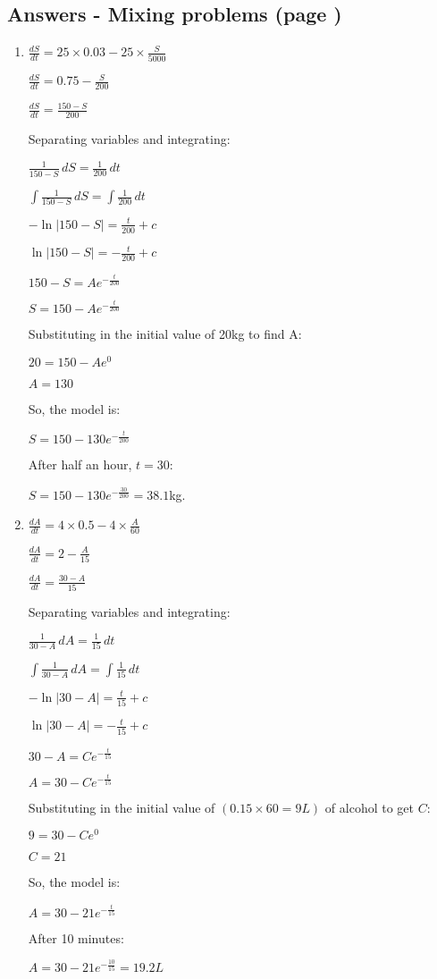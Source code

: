 \documentclass[../main.tex]{subfiles}
\begin{document}
\subsection*{Answers - Mixing problems (page \pageref{Mixing problems})}
\label{Mixing problems answers}
\begin{enumerate}[itemsep=0.7cm]
    \item 
    $\frac{dS}{dt}=25 \times 0.03 - 25 \times \frac{S}{5000}$

    $\frac{dS}{dt}=0.75 - \frac{S}{200}$

    $\frac{dS}{dt}=\frac{150-S}{200}$

    Separating variables and integrating:

    $\frac{1}{150-S}\,dS=\frac{1}{200}\,dt$

    $\int \frac{1}{150-S}\,dS=\int \frac{1}{200}\,dt$

    $-\ln|150-S|=\frac{t}{200}+c$

    $\ln|150-S|=-\frac{t}{200}+c$

    $150-S=Ae^{-\frac{t}{200}}$

    $S=150-Ae^{-\frac{t}{200}}$

    Substituting in the initial value of 20kg to find A:

    $20=150-Ae^{0}$

    $A=130$

    So, the model is:

    $S=150-130e^{-\frac{t}{200}}$

    After half an hour, $t=30$:

    $S=150-130e^{-\frac{30}{200}}=38.1$kg.

    \item
    $\frac{dA}{dt}=4 \times 0.5 - 4\times \frac{A}{60}$

    $\frac{dA}{dt}=2-\frac{A}{15}$

    $\frac{dA}{dt}=\frac{30-A}{15}$

    Separating variables and integrating:

    $\frac{1}{30-A}\,dA=\frac{1}{15}\,dt$

    $\int \frac{1}{30-A}\,dA=\int \frac{1}{15}\,dt$

    $-\ln|30-A|=\frac{t}{15}+c$

    $\ln|30-A|=-\frac{t}{15}+c$

    $30-A=Ce^{-\frac{t}{15}}$

    $A=30-Ce^{-\frac{t}{15}}$

    Substituting in the initial value of $(0.15 \times 60=9L)$ of alcohol to get $C$:

    $9=30-Ce^{0}$

    $C=21$

    So, the model is:

    $A=30-21e^{-\frac{t}{15}}$

    After 10 minutes:

    $A=30-21e^{-\frac{10}{15}}=19.2L$

\end{enumerate}
\end{document}
